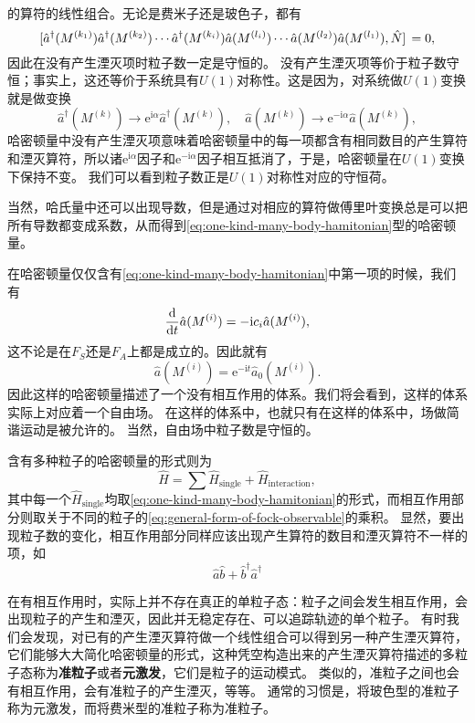 \documentclass[hyperref, UTF8, a4paper]{ctexart}
\newcommand*{\ii}{\mathrm{i}}
\newcommand*{\ee}{\mathrm{e}}
\begin{document}
的算符的线性组合。无论是费米子还是玻色子，都有
\[
    \comm*{\hat{a}^\dagger (M^{(k_1)}) \hat{a}^\dagger (M^{(k_2)}) \cdots \hat{a}^\dagger (M^{(k_i)}) \hat{a} (M^{(l_i)}) \cdots \hat{a} (M^{(l_2)}) \hat{a} (M^{(l_1)})}{\hat{N}} = 0,
\]
因此在没有产生湮灭项时粒子数一定是守恒的。
没有产生湮灭项等价于粒子数守恒；事实上，这还等价于系统具有$U(1)$对称性。这是因为，对系统做$U(1)$变换就是做变换
\[
    \hat{a}^\dagger(M^{(k)}) \longrightarrow \ee^{\ii \alpha} \hat{a}^\dagger(M^{(k)}), \quad \hat{a}(M^{(k)}) \longrightarrow \ee^{-\ii \alpha} \hat{a}(M^{(k)}),
\]
哈密顿量中没有产生湮灭项意味着哈密顿量中的每一项都含有相同数目的产生算符和湮灭算符，所以诸$\ee^{\ii \alpha}$因子和$\ee^{-\ii \alpha}$因子相互抵消了，于是，哈密顿量在$U(1)$变换下保持不变。
我们可以看到粒子数正是$U(1)$对称性对应的守恒荷。

当然，哈氏量中还可以出现导数，但是通过对相应的算符做傅里叶变换总是可以把所有导数都变成系数，从而得到\eqref{eq:one-kind-many-body-hamitonian}型的哈密顿量。

在哈密顿量仅仅含有\eqref{eq:one-kind-many-body-hamitonian}中第一项的时候，我们有
\[
    \dv{t} \hat{a}(M^{(i)}) = - \ii c_i \hat{a} (M^{(i)}),
\]
这不论是在$F_S$还是$F_A$上都是成立的。因此就有
\[
    \hat{a} (M^{(i)}) = \ee^{- \ii t} \hat{a}_0 (M^{(i)}).
\]
因此这样的哈密顿量描述了一个没有相互作用的体系。我们将会看到，这样的体系实际上对应着一个自由场。
在这样的体系中，也就只有在这样的体系中，场做简谐运动是被允许的。
当然，自由场中粒子数是守恒的。

含有多种粒子的哈密顿量的形式则为
\begin{equation}
    \hat{H} = \sum \hat{H}_\text{single} + \hat{H}_\text{interaction},
\end{equation}
其中每一个$\hat{H}_\text{single}$均取\eqref{eq:one-kind-many-body-hamitonian}的形式，而相互作用部分则取关于不同的粒子的\eqref{eq:general-form-of-fock-observable}的乘积。
显然，要出现粒子数的变化，相互作用部分同样应该出现产生算符的数目和湮灭算符不一样的项，如
\[
    \hat{a} \hat{b} + \hat{b}^\dagger \hat{a}^\dagger
\]

在有相互作用时，实际上并不存在真正的单粒子态：粒子之间会发生相互作用，会出现粒子的产生和湮灭，因此并无稳定存在、可以追踪轨迹的单个粒子。
有时我们会发现，对已有的产生湮灭算符做一个线性组合可以得到另一种产生湮灭算符，它们能够大大简化哈密顿量的形式，这种凭空构造出来的产生湮灭算符描述的多粒子态称为\textbf{准粒子}或者\textbf{元激发}，它们是粒子的运动模式。
类似的，准粒子之间也会有相互作用，会有准粒子的产生湮灭，等等。
通常的习惯是，将玻色型的准粒子称为元激发，而将费米型的准粒子称为准粒子。
\end{document}
